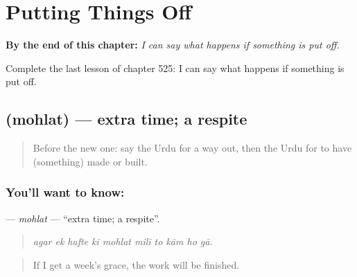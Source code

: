 
\chapter{Putting Things Off}
\label{ch:ur-putting-things-off}

\begin{chapteropening}
\textbf{By the end of this chapter:} \emph{I can say what happens if something is put off.}

Complete the last lesson of chapter 525: I can say what happens if something is put off.
\end{chapteropening}

\section[\texorpdfstring{\ur{مہلت} (mohlat)}{مہلت (mohlat)}]{ (mohlat) — extra time; a respite}

\label{lesson:UR-C525-mohlat}



\begin{quote}
Before the new one: say the Urdu for a way out, then the Urdu for to have (something) made or built.
\end{quote}

\subsection*{You'll want to know: }
\textbf{} — \emph{mohlat} — \textquotedblleft{}extra time; a respite\textquotedblright{}.

\begin{quote}
         
\end{quote}

\begin{quote}
\emph{agar ek hafte kī mohlat milī to kām ho gā.}
\end{quote}

\begin{quote}
If I get a week's grace, the work will be finished.
\end{quote}

